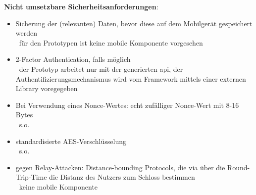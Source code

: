     \newpage
    \noindent \textbf{Nicht umsetzbare Sicherheitsanforderungen}:
    \begin{itemize}[noitemsep]
        \item Sicherung der (relevanten) Daten, bevor diese auf dem Mobilgerät gespeichert werden\cite{Ye2017}\\
            \textrightarrow\ für den Prototypen ist keine mobile Komponente vorgesehen
        \item 2-Factor Authentication, falls möglich\cite{Rose2016,Miessler2015}\\
            \textrightarrow\ der Prototyp arbeitet nur mit der generierten \gls{api}, der Authentifizierungsmechanismus wird vom Framework mittels einer externen Library voregegeben
        \item Bei Verwendung eines Nonce-Wertes: echt zufälliger Nonce-Wert mit 8-16 Bytes\cite{Rose2016}\\
            \textrightarrow\ s.o.
        \item standardisierte AES-Verschlüsselung\cite{Rose2016}\\
            \textrightarrow\ s.o.
        \item gegen Relay-Attacken: Distance-bounding Protocols, die via über die Round-Trip-Time die Distanz des Nutzers zum Schloss bestimmen\cite{Ho2016}\\ 
            \textrightarrow\ keine mobile Komponente
    \end{itemize}
    